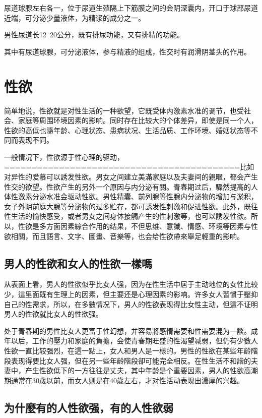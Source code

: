 \documentclass[12pt,UTF8]{ctexbook}
\begin{document}
尿道球腺左右各一，位于尿道生殖隔上下筋膜之间的会阴深囊内，开口于球部尿道近端，可分泌少量液体，为精浆的成分之一。

男性尿道长12~20公分，既有排尿功能，又有排精的功能。

其中有尿道球腺，可分泌液体，参与精液的组成，性交时有润滑阴茎头的作用。

\chapter{性欲}

简单地说，性欲就是对性生活的一种欲望，它既受体内激素水准的调节，也受社会、家庭等周围环境因素的影响。同时存在比较大的个体差异，即使是同一个人，性欲的高低也隨年龄、心理状态、患病状况、生活品质、工作环境、婚姻状态等不同而表现不同。

一般情况下，性欲源于性心理的驱动，===========================================比如对异性的爱慕可以誘发性欲。男女之间建立美滿家庭以及夫妻间的親暱，都会产生性交的欲望。性欲产生的另外一个原因与内分泌有關。青春期过后，驟然提高的人体性激素分泌水准会驱动性欲。男性精囊、前列腺等性腺内分泌物的增加与淤积，女子外阴前庭大腺等分泌物的过多贮存，都可誘发性刺激和促进性欲。此外，既往性生活的愉快感受，或者男女之间身体接觸产生的性刺激等，也可以誘发性欲。所以，性欲是多方面因素綜合作用的结果，不但思维、意識、情感、环境等因素与性欲相關，而且語言、文字、圖畫、音樂等，也会给性欲帶來舉足輕重的影响。

\section{男人的性欲和女人的性欲一樣嗎}

从表面上看，男人的性欲似乎比女人强，因为在性生活中居于主动地位的女性比较少，這里面既有生理上的因素，但主要还是心理因素的影响。许多女人習慣于壓抑自己的性需求，所以，在多數情况下，男人的性欲表现得比女性主动，但這不证明男人的性欲就比女人的性欲强。

处于青春期的男性比女人更富于性幻想，并容易將感情需要和性需要混为一談。成年以后，工作的壓力和家庭的負擔，会使青春期旺盛的性渴望减弱，但仍有少數人性欲一直比较强烈，在這一點上，女人和男人是一樣的。男性的性欲在某些年龄階段表现得要比女人强，但在另一些年龄階段卻可能完全相反。在性生活不和諧的夫妻中，产生性欲低下的一方往往是丈夫，其中年龄是个重要因素，男人的性欲高潮期通常在30歲以前，而女人则是在40歲左右，才对性活动表现出濃厚的兴趣。

\section{为什麼有的人性欲强，有的人性欲弱}
\end{document}
